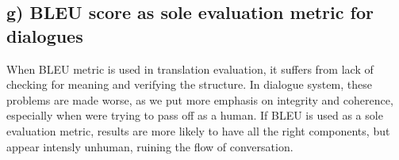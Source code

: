 \documentclass[12pt]{article}
\begin{document}
\subsection*{g) BLEU score as sole evaluation metric for dialogues}
When BLEU metric is used in translation evaluation, it suffers from
lack of checking for meaning and verifying the structure. In dialogue system,
these problems are made worse, as we put more emphasis on integrity and
coherence, especially when were trying to pass off as a human.
If BLEU is used as a sole evaluation metric, results are more likely to
have all the right components, but appear intensly unhuman, ruining the flow
of conversation.

 
\end{document}
